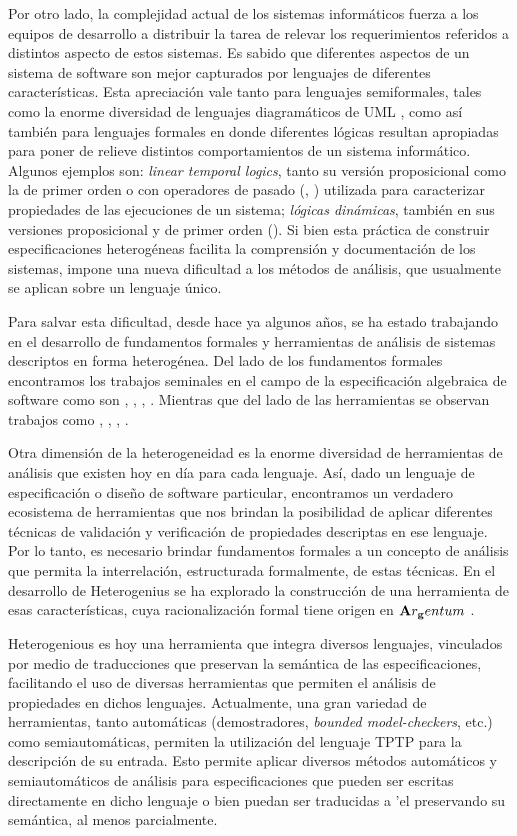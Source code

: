 Por otro lado, la complejidad actual de los sistemas informáticos fuerza a los equipos de desarrollo a distribuir la tarea de relevar los requerimientos referidos a distintos aspecto de estos sistemas. 
Es sabido que diferentes aspectos de un sistema de software son mejor capturados por lenguajes de diferentes características. 
Esta apreciación vale tanto para lenguajes semiformales, tales como la enorme diversidad de lenguajes diagramáticos de UML \cite{BRJ98}, como así también para lenguajes formales en donde diferentes lógicas resultan apropiadas para poner de relieve distintos comportamientos de un sistema informático.
Algunos ejemplos son: \emph{linear temporal logics}, tanto su versión proposicional como la de primer orden o con operadores de pasado (\cite{Pnu77}, \cite{MP95}) utilizada para caracterizar propiedades de las ejecuciones de un sistema; \emph{lógicas dinámicas}, también en sus versiones proposicional y de primer orden (\cite{HKT00}). 
Si bien esta práctica de construir especificaciones heterogéneas facilita la comprensión y documentación de los sistemas, impone una nueva dificultad a los métodos de análisis, que usualmente se aplican sobre un lenguaje único.

Para salvar esta dificultad, desde hace ya algunos años, se ha estado trabajando en el desarrollo de fundamentos formales y herramientas de análisis de sistemas descriptos en forma heterogénea. 
Del lado de los fundamentos formales encontramos los trabajos seminales en el campo de la especificación algebraica de software como son \cite{GB84}, \cite{GB92}, \cite{Tar96}, \cite{Dia02}. 
Mientras que del lado de las herramientas se observan trabajos como \cite{Mos02}, \cite{DF96}, \cite{DF02}, \cite{LF06}. 

Otra dimensión de la heterogeneidad es la enorme diversidad de herramientas de análisis que existen hoy en día para cada lenguaje. 
Así, dado un lenguaje de especificación o diseño de software particular, encontramos un verdadero ecosistema de herramientas que nos brindan la posibilidad de aplicar diferentes técnicas de validación y verificación de propiedades descriptas en ese lenguaje.
Por lo tanto, es necesario brindar fundamentos formales a un concepto de análisis que permita la interrelación, estructurada formalmente, de estas técnicas. 
En el desarrollo de Heterogenius \cite{heterogenius} se ha explorado la construcción de una herramienta de esas características, cuya racionalización formal tiene origen en ${\bf A}r_{\bf g}entum$ \cite{frias:relmics01}.

Heterogenious es hoy una herramienta que integra diversos lenguajes, vinculados por medio de traducciones que preservan la semántica de las especificaciones, facilitando el uso de diversas herramientas que permiten el análisis de propiedades en dichos lenguajes. Actualmente, una gran variedad de herramientas, tanto automáticas (demostradores, \emph{bounded model-checkers}, etc.) como semiautomáticas, permiten la utilización del lenguaje TPTP \cite{tptp} para la descripción de su entrada.
Esto permite aplicar diversos métodos automáticos y semiautomáticos de análisis para especificaciones que pueden ser escritas directamente en dicho lenguaje o bien puedan ser traducidas a 'el preservando su semántica, al menos parcialmente.

